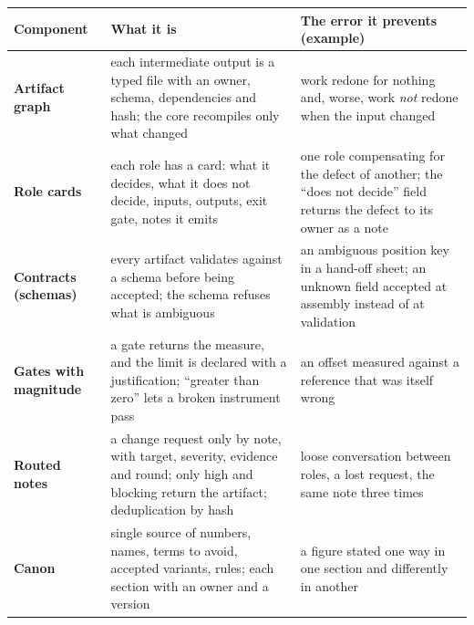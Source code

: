 \documentclass[
  american,
  10pt,
]{report}
\newcounter{none} %
\begin{document}
{\def\LTcaptype{none} %
\begin{longtable}[]{@{}
  >{\raggedright\arraybackslash}p{}
  >{\raggedright\arraybackslash}p{}
  >{\raggedright\arraybackslash}p{}@{}}
\toprule\noalign{}
\begin{minipage}[b]{\linewidth}\raggedright
Component
\end{minipage} & \begin{minipage}[b]{\linewidth}\raggedright
What it is
\end{minipage} & \begin{minipage}[b]{\linewidth}\raggedright
The error it prevents (example)
\end{minipage} \\
\midrule\noalign{}
\endhead
\bottomrule\noalign{}
\endlastfoot
\textbf{Artifact graph} & each intermediate output is a typed file with
an owner, schema, dependencies and hash; the core recompiles only what
changed & work redone for nothing and, worse, work \emph{not} redone
when the input changed \\
\textbf{Role cards} & each role has a card: what it decides, what it
does not decide, inputs, outputs, exit gate, notes it emits & one role
compensating for the defect of another; the ``does not decide'' field
returns the defect to its owner as a note \\
\textbf{Contracts (schemas)} & every artifact validates against a schema
before being accepted; the schema refuses what is ambiguous & an
ambiguous position key in a hand-off sheet; an unknown field accepted at
assembly instead of at validation \\
\textbf{Gates with magnitude} & a gate returns the measure, and the
limit is declared with a justification; ``greater than zero'' lets a
broken instrument pass & an offset measured against a reference that was
itself wrong \\
\textbf{Routed notes} & a change request only by note, with target,
severity, evidence and round; only high and blocking return the
artifact; deduplication by hash & loose conversation between roles, a
lost request, the same note three times \\
\textbf{Canon} & single source of numbers, names, terms to avoid,
accepted variants, rules; each section with an owner and a version & a
figure stated one way in one section and differently in another \\

\end{longtable}}
\end{document}
